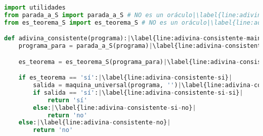 \begin{lstlisting}[language=Python, caption=\lstinline{adivina_consistente.py},label={lst:adivina-consistente}]
import utilidades
from parada_a_S import parada_a_S # NO es un oráculo|\label{line:adivina-consistente-import-1}|
from es_teorema_S import es_teorema_S # NO es un oráculo|\label{line:adivina-consistente-import-2}|

def adivina_consistente(programa):|\label{line:adivina-consistente-main}|
    programa_para = parada_a_S(programa)|\label{line:adivina-consistente-programa-para}|

    es_teorema = es_teorema_S(programa_para)|\label{line:adivina-consistente-es-teorema}|

    if es_teorema == 'sí':|\label{line:adivina-consistente-si}|
        salida = maquina_universal(programa, '')|\label{line:adivina-consistente-universal}|
        if salida == 'sí':|\label{line:adivina-consistente-si-si}|
            return 'sí'
        else:|\label{line:adivina-consistente-si-no}|
            return 'no'
    else:|\label{line:adivina-consistente-no}|
        return 'no'
\end{lstlisting}

